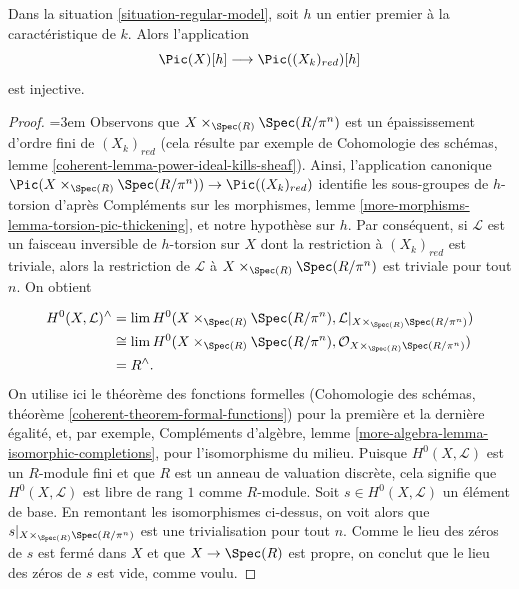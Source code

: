 \begin{lemma}
\label{lemma-torsion-embeds}
Dans la situation \ref{situation-regular-model}, soit $h$ un entier premier
à la caractéristique de $k$. Alors l'application
$$
\Pic(X)[h] \longrightarrow \Pic((X_k)_{red})[h]
$$
est injective.
\end{lemma}

\begin{proof}
\begingroup
\emergencystretch=3em
Observons que $X\times_{\Spec(R)}\Spec(R/\pi^n)$ est un épaississement
d'ordre fini de $(X_k)_{red}$ (cela résulte par exemple de Cohomologie des
schémas, lemme \ref{coherent-lemma-power-ideal-kills-sheaf}). Ainsi,
l'application canonique
$\Pic(X\times_{\Spec(R)}\Spec(R/\pi^n))\to\Pic((X_k)_{red})$ identifie les
sous-groupes de $h$-torsion d'après Compléments sur les morphismes, lemme
\ref{more-morphisms-lemma-torsion-pic-thickening}, et notre hypothèse sur
$h$. Par conséquent, si $\mathcal{L}$ est un faisceau inversible de
$h$-torsion sur $X$ dont la restriction à $(X_k)_{red}$ est triviale, alors
la restriction de $\mathcal{L}$ à
$X\times_{\Spec(R)}\Spec(R/\pi^n)$ est triviale pour tout $n$.
On obtient
\par
\endgroup
\begin{align*}
H^0(X, \mathcal{L})^\wedge
& =
\lim H^0(X \times_{\Spec(R)} \Spec(R/\pi^n),
\mathcal{L}|_{X \times_{\Spec(R)} \Spec(R/\pi^n)}) \\
& \cong
\lim H^0(X \times_{\Spec(R)} \Spec(R/\pi^n),
\mathcal{O}_{X \times_{\Spec(R)} \Spec(R/\pi^n)}) \\
& =
R^\wedge.
\end{align*}
On utilise ici le théorème des fonctions formelles (Cohomologie des schémas,
théorème \ref{coherent-theorem-formal-functions}) pour la première et la
dernière égalité, et, par exemple, Compléments d'algèbre, lemme
\ref{more-algebra-lemma-isomorphic-completions}, pour l'isomorphisme du
milieu. Puisque $H^0(X,\mathcal{L})$ est un $R$-module fini et que $R$ est
un anneau de valuation discrète, cela signifie que
$H^0(X,\mathcal{L})$ est libre de rang $1$ comme $R$-module.
Soit $s\in H^0(X,\mathcal{L})$ un élément de base. En remontant les
isomorphismes ci-dessus, on voit alors que
$s|_{X\times_{\Spec(R)}\Spec(R/\pi^n)}$ est une trivialisation pour tout
$n$. Comme le lieu des zéros de $s$ est fermé dans $X$ et que
$X\to\Spec(R)$ est propre, on conclut que le lieu des zéros de $s$ est vide,
comme voulu.
\end{proof}






